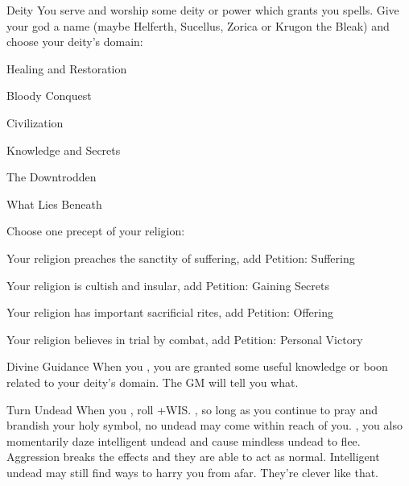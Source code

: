 \documentclass[8pt]{extarticle}
\begin{document}
\begin{minipage}[t]{4.6in}

\begin{basicmove}{Deity}
  You serve and worship some deity or power which grants you
  spells. Give your god a name (maybe Helferth, Sucellus, Zorica or
  Krugon the Bleak) and choose your deity’s domain:

\begin{multicols}{2}
  \begin{choices}
  \item Healing and Restoration
  \item Bloody Conquest
  \item Civilization
  \end{choices}
  \columnbreak
  \begin{choices}
  \item Knowledge and Secrets
  \item The Downtrodden
  \item What Lies Beneath
  \end{choices}
\end{multicols}

Choose one precept of your religion:
\begin{choices}
\item Your religion preaches the sanctity of suffering, add Petition:
  Suffering
\item Your religion is cultish and insular, add Petition: Gaining
  Secrets
\item Your religion has important sacrificial rites, add Petition:
  Offering
\item Your religion believes in trial by combat, add Petition:
  Personal Victory
\end{choices}
\end{basicmove}

\begin{basicmove}{Divine Guidance}
  When you , you are granted some useful knowledge or boon
  related to your deity’s domain. The GM will tell you what.
\end{basicmove}

\begin{basicmove}{Turn Undead}
  When you , roll +WIS. \onHit, so long as you continue
  to pray and brandish your holy symbol, no undead may come within
  reach of you. \onSuccess, you also momentarily daze intelligent
  undead and cause mindless undead to flee. Aggression breaks the
  effects and they are able to act as normal. Intelligent undead may
  still find ways to harry you from afar. They’re clever like that.
\end{basicmove}


\end{minipage}
\end{document}
